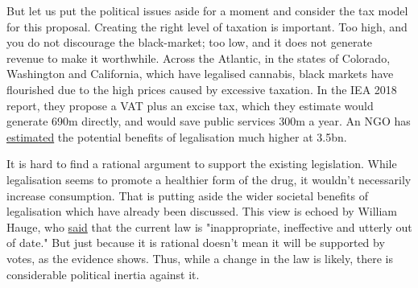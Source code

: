    But let us put the political issues aside for a moment and consider the
   tax model for this proposal. Creating the right level of taxation is
   important. Too high, and you do not discourage the black-market; too
   low, and it does not generate revenue to make it worthwhile. Across the
   Atlantic, in the states of Colorado, Washington and California, which
   have legalised cannabis, black markets have flourished due to the high
   prices caused by excessive taxation. In the IEA 2018 report, they
   propose a VAT plus an excise tax, which they estimate would generate
   \textsterling\;690m directly, and would save public services \textsterling\;300m a year. An NGO
   has \href{https://www.independent.co.uk/news/uk/politics/cannabis-decriminalisation-oil-uk-cigarettes-alcohol-bmg-research-poll-a8445631.html}{estimated} the potential benefits of legalisation much higher at
   \textsterling\;3.5bn.
   
   It is hard to find a rational argument to support the existing
   legislation. While legalisation seems to promote a healthier form of
   the drug, it wouldn't necessarily increase consumption. That is putting
   aside the wider societal benefits of legalisation which have already
   been discussed. This view is echoed by William Hauge, who \href{https://www.telegraph.co.uk/news/2018/06/18/war-cannabis-has-failed-utterly-tories-should-consider-new-approach/}{said} that
   the current law is "inappropriate, ineffective and utterly out of
   date." But just because it is rational doesn't mean it will be
   supported by votes, as the evidence shows. Thus, while a change in the
   law is likely, there is considerable political inertia against it.

